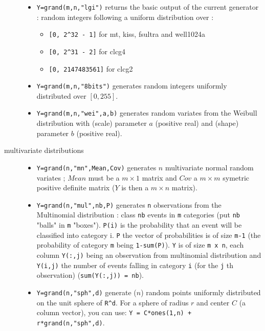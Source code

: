 \begin{description}
\begin{itemize}
\item {} \verb!Y=grand(m,n,"lgi")! returns the basic output of the current generator : random integers  
      following a uniform distribution over : 
      \begin{itemize}
      \item \verb![0, 2^32 - 1]! for mt, kiss, fsultra and well1024a
      \item \verb![0, 2^31 - 2]! for clcg4
      \item \verb![0, 2147483561]! for clcg2
      \end{itemize}

\item {} \verb!Y=grand(m,n,"8bits")! generates random integers uniformly 
      distributed over $[0,255]$.
  
\item {} 
  \verb!Y=grand(m,n,"wei",a,b)! generates random variates from the Weibull 
  distribution with (scale) parameter $a$ (positive real) and (shape) parameter $b$ (positive real).
\end{itemize}

\item[multivariate distributions]
\begin{itemize}
\item {}
  \verb!Y=grand(n,"mn",Mean,Cov)! generates  $n$ multivariate normal random variates ; 
  $Mean$ must be a $m \times 1$ matrix and $Cov$ a  $m \times m$ 
  symetric positive definite matrix  ($Y$ is then a  $m \times n$
  matrix).

\item {} 
   \verb!Y=grand(n,"mul",nb,P)! generates \verb!n! observations from the Multinomial 
  distribution :  class \verb!nb! events in \verb!m! categories (put \verb!nb!
  "balls" in \verb!m! "boxes"). \verb!P(i)! is the probability 
  that an event will be classified into category i. \verb!P! the vector of probabilities
  is of size  \verb!m-1! (the probability of category \verb!m! being \verb!1-sum(P)!).
  \verb!Y! is of size \verb!m x n!, each column \verb!Y(:,j)! being an observation 
  from multinomial distribution and \verb!Y(i,j)! the number of events falling in category 
  \verb!i! (for the \verb!j! th observation) (\verb!sum(Y(:,j)) = nb!).
  
\item {}
  \verb!Y=grand(n,"sph",d)! generate ($n$) random points uniformly
  distributed on the unit sphere of \verb!R^d!. For a sphere of radius
  $r$ and center $C$ (a column vector), you can use: 
  \verb!Y = C*ones(1,n) + r*grand(n,"sph",d)!.
  

\end{itemize}
\end{description}
